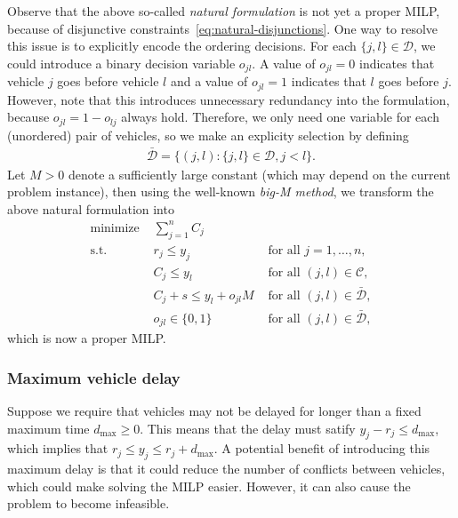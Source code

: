 \documentclass{article}
\theoremstyle{definition}
\theoremstyle{plain}
\begin{document}
Observe that the above so-called \textit{natural formulation} is not yet a
proper MILP, because of disjunctive constraints~\eqref{eq:natural-disjunctions}.
One way to resolve this issue is to explicitly encode the ordering decisions.
For each $\{j,l\} \in \mathcal{D}$, we could introduce a binary decision variable
$o_{jl}$. A value of $o_{jl} = 0$ indicates that vehicle $j$ goes before vehicle
$l$ and a value of $o_{jl} = 1$ indicates that $l$ goes before $j$. However,
note that this introduces unnecessary redundancy into the formulation, because
$o_{jl} = 1 - o_{lj}$ always hold. Therefore, we only need one variable for each
(unordered) pair of vehicles, so we make an explicity selection by defining
\begin{align}
  \bar{\mathcal{D}} = \{ (j,l) : \{ j,l \} \in \mathcal{D}, j < l \}.
\end{align}
Let $M > 0$ denote a sufficiently large constant (which may depend on the
current problem instance), then using the well-known \textit{big-M method}, we
transform the above natural formulation into
%
\begin{subequations}
\begin{align}
  \text{minimize } & \sum_{j=1}^{n} C_{j} & \\
  \text{s.t. } & r_{j} \leq y_{j} & \text{ for all } j=1, \dots, n, \\
              & C_{j} \leq y_{l} & \text{ for all } (j,l) \in \mathcal{C}, \\
              & C_{j} + s \leq y_{l} + o_{jl}M  & \text{ for all } (j,l) \in \bar{\mathcal{D}}, \label{eq:disjunctive-constraints} \\
              & o_{jl} \in \{ 0, 1 \} & \text{ for all } (j,l) \in \bar{\mathcal{D}} ,
\end{align}
\end{subequations}
which is now a proper MILP.

\subsubsection{Maximum vehicle delay}

Suppose we require that vehicles may not be delayed for longer than a fixed
maximum time $d_{\text{max}} \geq 0$. This means that the delay must satify
$y_{j} - r_{j} \leq d_{\text{max}}$, which implies that
$r_{j} \leq y_{j} \leq r_{j} + d_{\text{max}}$. A potential benefit of
introducing this maximum delay is that it could reduce the number of conflicts
between vehicles, which could make solving the MILP easier. However, it can also
cause the problem to become infeasible.
\end{document}

